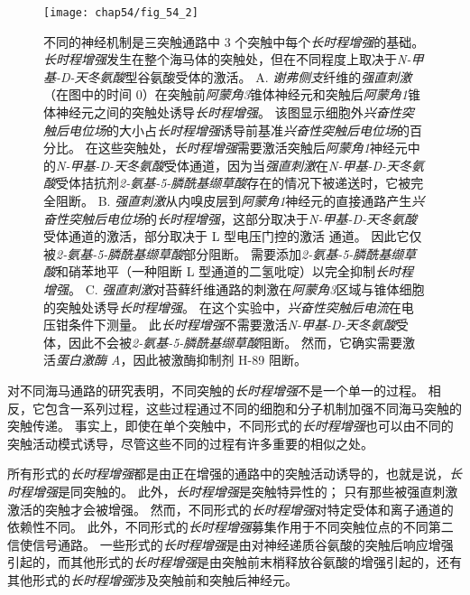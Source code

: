 \begin{figure}[htbp]
	\centering
	\texttt{[image: chap54/fig\_54\_2]}
	\caption{不同的神经机制是三突触通路中 3 个突触中每个\textit{长时程增强}的基础。
		\textit{长时程增强}发生在整个海马体的突触处，但在不同程度上取决于\textit{N-甲基-D-天冬氨酸}型谷氨酸受体的激活。
		A. \textit{谢弗侧支}纤维的\textit{强直刺激}（在图中的时间 0）在突触前\textit{阿蒙角3}锥体神经元和突触后\textit{阿蒙角1}锥体神经元之间的突触处诱导\textit{长时程增强}。
		该图显示细胞外\textit{兴奋性突触后电位场}的大小占\textit{长时程增强}诱导前基准\textit{兴奋性突触后电位场}的百分比。
		在这些突触处，\textit{长时程增强}需要激活突触后\textit{阿蒙角1}神经元中的\textit{N-甲基-D-天冬氨酸}受体通道，因为当\textit{强直刺激}在\textit{N-甲基-D-天冬氨酸}受体拮抗剂\textit{2-氨基-5-膦酰基缬草酸}存在的情况下被递送时，它被完全阻断\cite{morgan2001electrical}。
		B. \textit{强直刺激}从内嗅皮层到\textit{阿蒙角1}神经元的直接通路产生\textit{兴奋性突触后电位场}的\textit{长时程增强}，这部分取决于\textit{N-甲基-D-天冬氨酸}受体通道的激活，部分取决于 L 型电压门控的激活  通道。
		因此它仅被\textit{2-氨基-5-膦酰基缬草酸}部分阻断。
		需要添加\textit{2-氨基-5-膦酰基缬草酸}和硝苯地平（一种阻断 L 型通道的二氢吡啶）以完全抑制\textit{长时程增强}。
		C. \textit{强直刺激}对苔藓纤维通路的刺激在\textit{阿蒙角3}区域与锥体细胞的突触处诱导\textit{长时程增强}。
		在这个实验中，\textit{兴奋性突触后电流}在电压钳条件下测量。
		此\textit{长时程增强}不需要激活\textit{N-甲基-D-天冬氨酸}受体，因此不会被\textit{2-氨基-5-膦酰基缬草酸}阻断。
		然而，它确实需要激活\textit{蛋白激酶 A}，因此被激酶抑制剂 H-89 阻断\cite{zalutsky1990comparison}。}
	\label{fig:54_2}
\end{figure}


对不同海马通路的研究表明，不同突触的\textit{长时程增强}不是一个单一的过程。
相反，它包含一系列过程，这些过程通过不同的细胞和分子机制加强不同海马突触的突触传递。
事实上，即使在单个突触中，不同形式的\textit{长时程增强}也可以由不同的突触活动模式诱导，尽管这些不同的过程有许多重要的相似之处。


所有形式的\textit{长时程增强}都是由正在增强的通路中的突触活动诱导的，也就是说，\textit{长时程增强}是同突触的。
此外，\textit{长时程增强}是突触特异性的；
只有那些被强直刺激激活的突触才会被增强。
然而，不同形式的\textit{长时程增强}对特定受体和离子通道的依赖性不同。
此外，不同形式的\textit{长时程增强}募集作用于不同突触位点的不同第二信使信号通路。
一些形式的\textit{长时程增强}是由对神经递质谷氨酸的突触后响应增强引起的，而其他形式的\textit{长时程增强}是由突触前末梢释放谷氨酸的增强引起的，还有其他形式的\textit{长时程增强}涉及突触前和突触后神经元。


